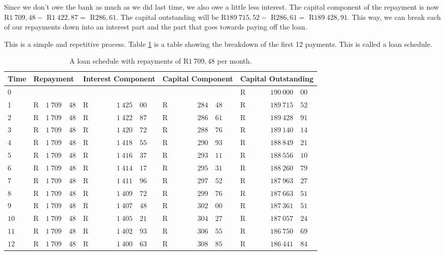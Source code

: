 Since we don't owe the bank as much as we did last time, we also owe a little less interest. The capital component of the repayment is now R$1~709,48 -$ R$1~422,87 =$ R$286,61$. The capital outstanding will be R$189~715,52 -$ R$286,61 =$ R$189~428,91$. This way, we can break each of our repayments down into an interest part and the part that goes towards paying off the loan.

This is a simple and repetitive process. Table \ref{tb:lschedule1} is a table showing the breakdown of the first 12 payments. This is called a loan schedule.

\begin{table}
\begin{center}
\begin{tabular}{|l|lr@{,}l|lr@{,}l|lr@{,}l|lr@{,}l|}
\hline
Time&\multicolumn{3}{l|}{Repayment}&\multicolumn{3}{p{2cm}|}{Interest Component}&\multicolumn{3}{p{2cm}|}{Capital Component}&\multicolumn{3}{p{2.5cm}|}{Capital Outstanding}\\
\hline
\hline
$0$&\multicolumn{3}{l|}{}&\multicolumn{3}{r|}{}&\multicolumn{3}{r|}{}&R&$190~000$&$00$\\
1&R&$1~709$&$48$&R&$1~425$&$00$&R&$284$&$48$&R&$189~715$&$52$\\
$2$&R&$1~709$&$48$&R&$1~422$&$87$&R&$286$&$61$&R&$189~428$&$91$\\
$3$&R&$1~709$&$48$&R&$1~420$&$72$&R&$288$&$76$&R&$189~140$&$14$\\
$4$&R&$1~709$&$48$&R&$1~418$&$55$&R&$290$&$93$&R&$188~849$&$21$\\
$5$&R&$1~709$&$48$&R&$1~416$&$37$&R&$293$&$11$&R&$188~556$&$10$\\
$6$&R&$1~709$&$48$&R&$1~414$&$17$&R&$295$&$31$&R&$188~260$&$79$\\
$7$&R&$1~709$&$48$&R&$1~411$&$96$&R&$297$&$52$&R&$187~963$&$27$\\
$8$&R&$1~709$&$48$&R&$1~409$&$72$&R&$299$&$76$&R&$187~663$&$51$\\
$9$&R&$1~709$&$48$&R&$1~407$&$48$&R&$302$&$00$&R&$187~361$&$51$\\
$10$&R&$1~709$&$48$&R&$1~405$&$21$&R&$304$&$27$&R&$187~057$&$24$\\
$11$&R&$1~709$&$48$&R&$1~402$&$93$&R&$306$&$55$&R&$186~750$&$69$\\
$12$&R&$1~709$&$48$&R&$1~400$&$63$&R&$308$&$85$&R&$186~441$&$84$\\

\hline
\end{tabular}
\end{center}
\caption{A loan schedule with repayments of R$1~709,48$ per month.}
\label{tb:lschedule1}
\end{table}


